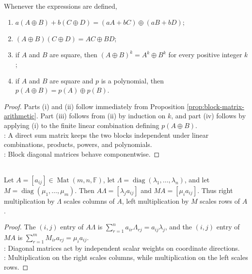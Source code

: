 \begin{proposition} \label{prop:direct-sum-matrix-algebra} \\
Whenever the expressions are defined,
\begin{enumerate}[label=(\roman*)]
\setlength{\itemsep}{0pt}
\item $a(A\oplus B)+b(C\oplus D)=(aA+bC)\oplus(aB+bD)$;
\item $(A\oplus B)(C\oplus D)=AC\oplus BD$;
\item if $A$ and $B$ are square, then $(A\oplus B)^k=A^k\oplus B^k$ for every positive integer $k$;
\item if $A$ and $B$ are square and $p$ is a polynomial, then $p(A\oplus B)=p(A)\oplus p(B)$.
\end{enumerate}
\begin{proof}
Parts (i) and (ii) follow immediately from Proposition \ref{prop:block-matrix-arithmetic}. Part (iii) follows from (ii) by induction on $k$, and part (iv) follows by applying (i) to the finite linear combination defining $p(A\oplus B)$.\\
: A direct sum matrix keeps the two blocks independent under linear combinations, products, powers, and polynomials.\\
: Block diagonal matrices behave componentwise.
\end{proof}
\end{proposition}

\begin{proposition} \label{prop:diagonal-multiplication-scales-rows-columns} \\
Let $A=[a_{ij}]\in\operatorname{Mat}(m,n,\mathbb{F})$, let $\Lambda=\operatorname{diag}(\lambda_1,\ldots,\lambda_n)$, and let $M=\operatorname{diag}(\mu_1,\ldots,\mu_m)$. Then $A\Lambda=[\lambda_j a_{ij}]$ and $MA=[\mu_i a_{ij}]$. Thus right multiplication by $\Lambda$ scales columns of $A$, left multiplication by $M$ scales rows of $A$.
\begin{proof}
The $(i,j)$ entry of $A\Lambda$ is $\sum_{r=1}^n a_{ir}\Lambda_{rj}=a_{ij}\lambda_j$, and the $(i,j)$ entry of $MA$ is $\sum_{r=1}^m M_{ir}a_{rj}=\mu_i a_{ij}$.\\
: Diagonal matrices act by independent scalar weights on coordinate directions.\\
: Multiplication on the right scales columns, while multiplication on the left scales rows.
\end{proof}
\end{proposition}

